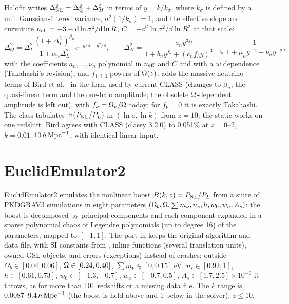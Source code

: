 Halofit \cite{Smith2003,Takahashi2012} writes $\Delta^2_{\rm NL}=\Delta^2_Q+\Delta^2_H$ in terms of $y=k/k_\sigma$, where
$k_\sigma$ is defined by a unit Gaussian-filtered variance, $\sigma^2(1/k_\sigma)=1$, and the effective slope and curvature
$n_{\rm eff}=-3-\mathrm{d}\ln\sigma^2/\mathrm{d}\ln R$, $C=-\dd^2\ln\sigma^2/\dd\ln R^2$ at that scale:
\begin{equation}
\Delta^2_Q=\Delta^2_L\frac{(1+\Delta^2_L)^{\beta_n}}{1+\alpha_n\Delta^2_L}e^{-y/4-y^2/8},\qquad
\Delta^2_H=\frac{a_ny^{3f_1}}{1+b_ny^{f_2}+(c_nf_3y)^{3-\gamma_n}}\,\frac{1}{1+\mu_ny^{-1}+\nu_ny^{-2}},
\end{equation}
with the coefficients $a_n,\ldots,\nu_n$ polynomial in $n_{\rm eff}$ and $C$ and with a $w$ dependence (Takahashi's
revision), and $f_{1,2,3}$ powers of $\Omega(z)$.  adds the massive-neutrino terms of Bird et al.\
\cite{Bird2012} in the form used by current CLASS (changes to $\beta_n$, the quasi-linear term and the one-halo amplitude;
the obsolete $\Omega$-dependent amplitude is left out), with $f_\nu=\Omega_\nu/\Omega$ today; for $f_\nu=0$ it is exactly
Takahashi. The class tabulates $\ln(P_{\rm NL}/P_L)$ in $(\ln a,\ln k)$ from $z=10$; the static 
works on one redshift. Bird agrees with CLASS (classy 3.2.0) to 0.051\% at $z=0$--2, $k=0.01$--$10\,h\,\mathrm{Mpc}^{-1}$, with identical
linear input.

\section{EuclidEmulator2}\label{sec:fit-ee2}

EuclidEmulator2 \cite{Knabenhans2021} emulates the nonlinear boost $B(k,z)=P_{\rm NL}/P_L$ from a suite of
\textsc{PKDGRAV3} simulations in eight parameters $(\Omega_b,\Omega,\sum m_\nu,n_s,h,w_0,w_a,A_s)$: the boost is decomposed by
principal components and each component expanded in a sparse polynomial chaos of Legendre polynomials (up to degree 16) of the
parameters, mapped to $[-1,1]$. The port in \file{EuclidEmulator2.h} keeps the original algorithm and data file, with SI
constants from \file{Units.h}, inline functions (several translation units), owned GSL objects, and errors (exceptions)
instead of crashes: outside $\Omega_b\in[0.04,0.06]$, $\Omega\in[0.24,0.40]$, $\sum m_\nu\in[0,0.15]$\,eV, $n_s\in[0.92,1]$,
$h\in[0.61,0.73]$, $w_0\in[-1.3,-0.7]$, $w_a\in[-0.7,0.5]$, $A_s\in[1.7,2.5]\times10^{-9}$ it throws, as for more than 101
redshifts or a missing data file. The $k$ range is $0.0087$--$9.4\,h\,\mathrm{Mpc}^{-1}$ (the boost is held above and 1 below in the
solver); $z\le10$.

